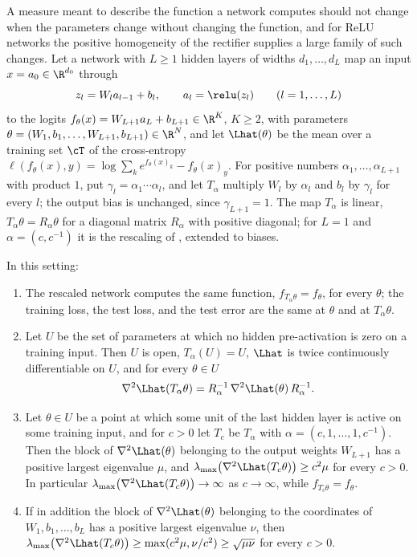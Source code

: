 \begin{refsection}
A measure meant to describe the function a network computes should not change when the parameters change without changing the function, and for ReLU networks the positive homogeneity of the rectifier supplies a large family of such changes. Let a network with $L\ge1$ hidden layers of widths $d_1,\dots,d_L$ map an input $x=a_0\in\R^{d_0}$ through
\[
z_l=W_la_{l-1}+b_l,\qquad a_l=\relu(z_l)\qquad(l=1,\dots,L)
\]
to the logits $f_\theta(x)=W_{L+1}a_L+b_{L+1}\in\R^K$, $K\ge2$, with parameters $\theta=(W_1,b_1,\dots,W_{L+1},b_{L+1})\in\R^N$, and let $\Lhat(\theta)$ be the mean over a training set $\cT$ of the cross-entropy $\ell(f_\theta(x),y)=\log\sum_ke^{f_\theta(x)_k}-f_\theta(x)_y$. For positive numbers $\alpha_1,\dots,\alpha_{L+1}$ with product $1$, put $\gamma_l=\alpha_1\cdots\alpha_l$, and let $T_\alpha$ multiply $W_l$ by $\alpha_l$ and $b_l$ by $\gamma_l$ for every $l$; the output bias is unchanged, since $\gamma_{L+1}=1$. The map $T_\alpha$ is linear, $T_\alpha\theta=R_\alpha\theta$ for a diagonal matrix $R_\alpha$ with positive diagonal; for $L=1$ and $\alpha=(c,c^{-1})$ it is the rescaling of \textcite{DinhEtAl2017}, extended to biases.

\begin{theorem}\label{thm:sharpness:rescaling}
In this setting:
\begin{enumerate}
\item The rescaled network computes the same function, $f_{T_\alpha\theta}=f_\theta$, for every $\theta$; the training loss, the test loss, and the test error are the same at $\theta$ and at $T_\alpha\theta$.
\item Let $U$ be the set of parameters at which no hidden pre-activation is zero on a training input. Then $U$ is open, $T_\alpha(U)=U$, $\Lhat$ is twice continuously differentiable on $U$, and for every $\theta\in U$
\begin{equation}\label{eq:sharpness:hessian}
\nabla^2\Lhat(T_\alpha\theta)=R_\alpha^{-1}\,\nabla^2\Lhat(\theta)\,R_\alpha^{-1}.
\end{equation}
\item Let $\theta\in U$ be a point at which some unit of the last hidden layer is active on some training input, and for $c>0$ let $T_c$ be $T_\alpha$ with $\alpha=(c,1,\dots,1,c^{-1})$. Then the block of $\nabla^2\Lhat(\theta)$ belonging to the output weights $W_{L+1}$ has a positive largest eigenvalue $\mu$, and $\lambda_{\max}\bigl(\nabla^2\Lhat(T_c\theta)\bigr)\ge c^2\mu$ for every $c>0$. In particular $\lambda_{\max}\bigl(\nabla^2\Lhat(T_c\theta)\bigr)\to\infty$ as $c\to\infty$, while $f_{T_c\theta}=f_\theta$.
\item If in addition the block of $\nabla^2\Lhat(\theta)$ belonging to the coordinates of $W_1,b_1,\dots,b_L$ has a positive largest eigenvalue $\nu$, then $\lambda_{\max}\bigl(\nabla^2\Lhat(T_c\theta)\bigr)\ge\max(c^2\mu,\nu/c^2)\ge\sqrt{\mu\nu}$ for every $c>0$.
\end{enumerate}
\end{theorem}


\end{refsection}
